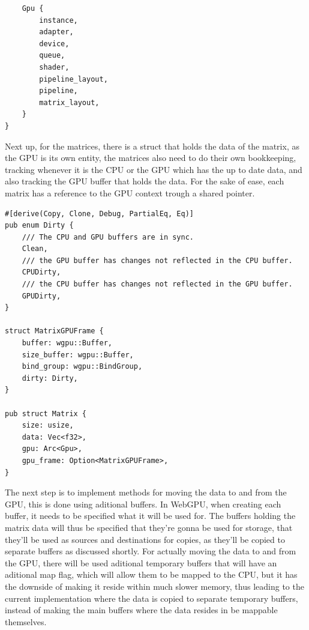 \documentclass{article}
\begin{document}
\begin{appendices}
\begin{verbatim}
	Gpu {
		instance,
		adapter,
		device,
		queue,
		shader,
		pipeline_layout,
		pipeline,
		matrix_layout,
	}
}
\end{verbatim}

Next up, for the matrices, there is a struct that holds the data of the matrix,
as the GPU is its own entity, the matrices also need to do
their own bookkeeping, tracking whenever it is the CPU or the GPU which
has the up to date data, and also tracking the GPU buffer that holds the data.
For the sake of ease, each matrix has a reference to the GPU context trough
a shared pointer.

\begin{verbatim}
#[derive(Copy, Clone, Debug, PartialEq, Eq)]
pub enum Dirty {
	/// The CPU and GPU buffers are in sync.
	Clean,
	/// the GPU buffer has changes not reflected in the CPU buffer.
	CPUDirty,
	/// the CPU buffer has changes not reflected in the GPU buffer.
	GPUDirty,
}

struct MatrixGPUFrame {
	buffer: wgpu::Buffer,
	size_buffer: wgpu::Buffer,
	bind_group: wgpu::BindGroup,
	dirty: Dirty,
}

pub struct Matrix {
	size: usize,
	data: Vec<f32>,
	gpu: Arc<Gpu>,
	gpu_frame: Option<MatrixGPUFrame>,
}
\end{verbatim}

The next step is to implement methods for moving the data to and from the GPU,
this is done using aditional buffers.
In WebGPU, when creating each buffer, it needs to be specified what it will be used for.
The buffers holding the matrix data will thus be specified that they're gonna be used for storage,
that they'll be used as sources and destinations for copies, as they'll be copied to separate buffers as discussed shortly.
For actually moving the data to and from the GPU, there will be used aditional temporary
buffers that will have an aditional map flag, which will allow them to be mapped to the CPU,
but it has the downside of making it reside within much slower memory, thus leading to the current implementation
where the data is copied to separate temporary buffers, instead of making the main buffers where the data resides in
be mappable themselves.



\end{appendices}
\end{document}
